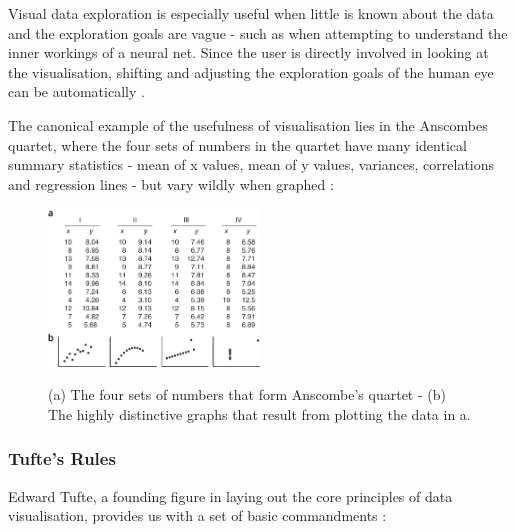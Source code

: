 \documentclass[a4paper,11pt,titlepage]{article}
\begin{document}
		\par 
		Visual data exploration is especially useful when little is known about the data and the exploration goals are vague - such as when attempting to understand the inner workings of a neural net. Since the user is directly involved in looking at the visualisation, shifting and adjusting the exploration goals of the human eye can be automatically \cite{Keim2002}.
		\par 
		The canonical example of the usefulness of visualisation lies in the Anscombes quartet, where the four sets of numbers in the quartet have many identical summary statistics - mean of x values, mean of y values, variances, correlations and regression lines - but vary wildly when graphed \cite{Shoresh2011}:

		\begin{figure}[H]
    			\centering	
				{{\includegraphics[width=0.5\textwidth]
    				{img/anscombes_quartet} 
    			}}%
    			\caption{(a) The four sets of numbers that form Anscombe's quartet -  (b) The highly distinctive graphs that result from plotting the data in a.}%
		\end{figure}



\subsubsection{Tufte's Rules}
		\par 
		Edward Tufte, a founding figure in laying out the core principles of data visualisation, provides us with a set of basic commandments \cite{Tufte2001}:		
\end{document}
